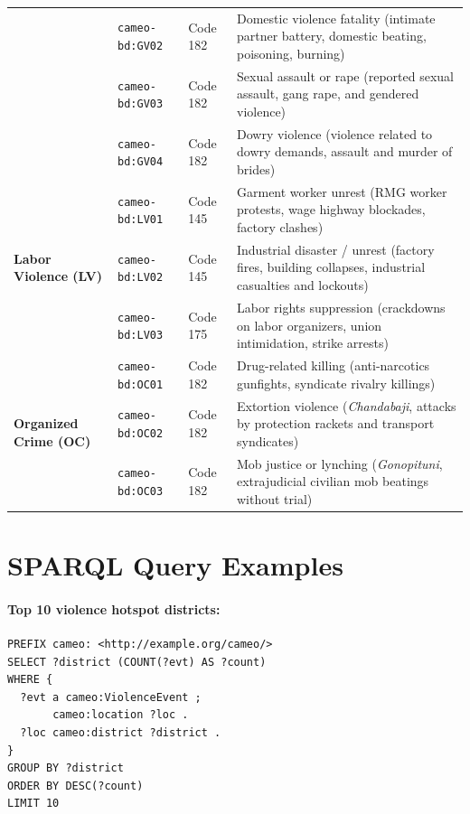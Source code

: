 \documentclass[11pt,a4paper]{article}
\begin{document}
\begin{table}[h]
\begin{tabular}{lllp{7.5cm}}
& \texttt{cameo-bd:GV02} & Code 182 & Domestic violence fatality (intimate partner battery, domestic beating, poisoning, burning) \\
& \texttt{cameo-bd:GV03} & Code 182 & Sexual assault or rape (reported sexual assault, gang rape, and gendered violence) \\
& \texttt{cameo-bd:GV04} & Code 182 & Dowry violence (violence related to dowry demands, assault and murder of brides) \\
\midrule
\multirow{3}{*}{\textbf{Labor Violence (LV)}} 
& \texttt{cameo-bd:LV01} & Code 145 & Garment worker unrest (RMG worker protests, wage highway blockades, factory clashes) \\
& \texttt{cameo-bd:LV02} & Code 145 & Industrial disaster / unrest (factory fires, building collapses, industrial casualties and lockouts) \\
& \texttt{cameo-bd:LV03} & Code 175 & Labor rights suppression (crackdowns on labor organizers, union intimidation, strike arrests) \\
\midrule
\multirow{3}{*}{\textbf{Organized Crime (OC)}} 
& \texttt{cameo-bd:OC01} & Code 182 & Drug-related killing (anti-narcotics gunfights, syndicate rivalry killings) \\
& \texttt{cameo-bd:OC02} & Code 182 & Extortion violence (\textit{Chandabaji}, attacks by protection rackets and transport syndicates) \\
& \texttt{cameo-bd:OC03} & Code 182 & Mob justice or lynching (\textit{Gonopituni}, extrajudicial civilian mob beatings without trial) \\
\bottomrule
\end{tabular}
\end{table}

\section{SPARQL Query Examples}
\label{app:sparql}

\paragraph{Top 10 violence hotspot districts:}
\begin{verbatim}
PREFIX cameo: <http://example.org/cameo/>
SELECT ?district (COUNT(?evt) AS ?count)
WHERE {
  ?evt a cameo:ViolenceEvent ;
       cameo:location ?loc .
  ?loc cameo:district ?district .
}
GROUP BY ?district
ORDER BY DESC(?count)
LIMIT 10
\end{verbatim}
\end{document}

